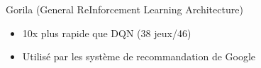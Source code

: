 
\begin{frame}
  Gorila (General ReInforcement Learning Architecture)
  \begin{itemize}
  \item 10x plus rapide que DQN (38 jeux/46)
  \item Utilisé par les système de recommandation de Google
  \end{itemize}
\end{frame}
